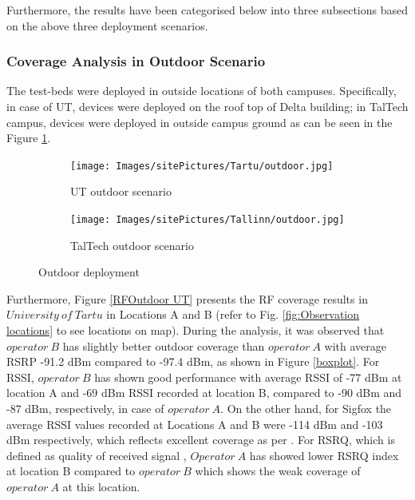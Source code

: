 \documentclass[12pt]{article}
\begin{document}
Furthermore, the results have been categorised below into three subsections based on the above three deployment scenarios.

\subsubsection{Coverage Analysis in Outdoor Scenario}\label{Outdoor Analysis}

The test-beds were deployed in outside locations of both campuses. Specifically, in case of UT, devices were deployed on the roof top of Delta building; in TalTech campus, devices were deployed in outside campus ground as can be seen in the Figure \ref{fig:Outdoor deployment}.\par



\begin{figure}[H]
\centering
\begin{subfigure}[t]{0.42\linewidth}
  \centering
   \texttt{[image: Images/sitePictures/Tartu/outdoor.jpg]} 
  \caption{UT outdoor scenario}
\end{subfigure}
\begin{subfigure}[t]{0.42\linewidth}
  \centering
  \texttt{[image: Images/sitePictures/Tallinn/outdoor.jpg]} 
  \caption{TalTech outdoor scenario}
\end{subfigure}

\caption{Outdoor deployment}
 \label{fig:Outdoor deployment}
\end{figure}

Furthermore, Figure \ref{RFOutdoor UT} presents the RF coverage results  in $University\ of\  Tartu$ in Locations A and B (refer to Fig. \ref{fig:Observation locations} to see locations on map). During the analysis, it was observed that $operator\ B$ has slightly better outdoor coverage than $operator\ A $ with average RSRP -91.2 dBm compared to -97.4 dBm, as shown in Figure \ref{boxplot}. For RSSI, $operator\ B$ has shown good performance with average RSSI of -77 dBm at location A and -69 dBm RSSI recorded at location B, compared to -90 dBm and -87 dBm, respectively, in case of $operator\ A$. On the other hand, for Sigfox the average RSSI values recorded at Locations A and B were -114 dBm and -103 dBm respectively, which reflects excellent coverage as per \cite{sigfoxRSSI}. For RSRQ, which is defined as quality of received signal \cite{3GPP}, $Operator\ A$ has showed lower RSRQ index at location B compared to $operator\ B$ which shows the weak coverage of $operator\ A$ at this location.\par
\end{document}
